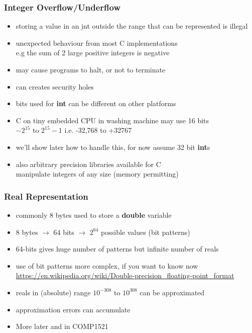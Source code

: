 \begin{frame}
\frametitle{Integer Overflow/Underflow}
\begin{itemize}
\item storing a value in an {\b int} outside the range that can be represented is illegal
\item unexpected behaviour from most C implementations \\
e.g the sum of  2 large positive integers is negative
\item may cause programs to halt, or not to terminate
\item can creates security holes
\item bits used for {\bf int} can be different on other platforms \\
\item C on tiny embedded CPU in washing machine may use 16 bits \\
 $-2^{15}$ to $2^{15}-1$ i.e. -32,768 to +32767 \\
\item we'll show later how to handle this, for now assume 32 bit {\bf int}s
\item also arbitrary precision libraries available for C \\
manipulate integers of any size (memory permitting)
\end{itemize}

\end{frame}

\begin{frame}
\frametitle{Real Representation}
\begin{itemize}
\item commonly 8 bytes used to store a {\bf double}  variable
\item 8 bytes $\rightarrow$ 64 bits $\rightarrow$ $2^{64}$ possible values (bit patterns)
\item 64-bits gives huge number of patterns but infinite number of reals
\item use of bit patterns more complex, if you want to know now \\
{\small \url{https://en.wikipedia.org/wiki/Double-precision_floating-point_format}}
\item reals in (absolute) range $10^{-308}$ to $10^{308}$ can be approximated
\item approximation errors can accumulate
\item More later and in COMP1521
\end{itemize}
\end{frame}

